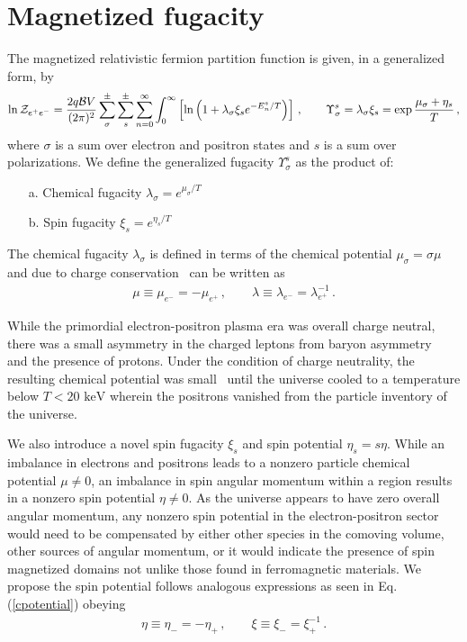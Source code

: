 \documentclass[a4paper]{article}
\newcommand*{\keV}{\text{ keV}}
\newcommand{\req}[1]{Eq.\,(\ref{#1})}
\begin{document}
\section{Magnetized fugacity}
\label{sec:fugacity}
\noindent The magnetized relativistic fermion partition function is given, in a generalized form, by
\begin{align}
    \label{partition}
    \ln{\cal Z}_{e^{+}e^{-}}=\frac{2q{\cal B}V}{(2\pi)^{2}}\sum_{\sigma}^{\pm}\sum_{s}^{\pm}\sum_{n=0}^{\infty}\int_{0}^{\infty}\left[\ln\left(1+\lambda_{\sigma}\xi_{s}e^{-E_{n}^{s}/T}\right)\right]\,,\qquad\Upsilon_{\sigma}^{s}=\lambda_{\sigma}\xi_{s}=\exp{\frac{\mu_{\sigma}+\eta_{s}}{T}}\,,
\end{align}
where $\sigma$ is a sum over electron and positron states and $s$ is a sum over polarizations. We define the generalized fugacity $\Upsilon_{\sigma}^{s}$ as the product of:
\begin{itemize}
    \item[a.] Chemical fugacity $\lambda_{\sigma}=e^{\mu_{\sigma}/T}$
    \item[b.] Spin fugacity $\xi_{s}=e^{\eta_{s}/T}$
\end{itemize}
The chemical fugacity $\lambda_{\sigma}$ is defined in terms of the chemical potential $\mu_{\sigma}=\sigma\mu$ and due to charge conservation~\cite{elze1980relativistic} can be written as 
\begin{align}
    \label{cpotential}
    \mu\equiv\mu_{e^{-}}=-\mu_{e^{+}}\,,\qquad
    \lambda\equiv\lambda_{e^{-}}=\lambda_{e^{+}}^{-1}\,.
\end{align}

While the primordial electron-positron plasma era was overall charge neutral, there was a small asymmetry in the charged leptons from baryon asymmetry~\cite{canetti2012matter} and the presence of protons. Under the condition of charge neutrality, the resulting chemical potential was small~\cite{rafelski2023short} until the universe cooled to a temperature below $T<20\keV$ wherein the positrons vanished from the particle inventory of the universe.

We also introduce a novel spin fugacity $\xi_{s}$ and spin potential $\eta_{s}=s\eta$. While an imbalance in electrons and positrons leads to a nonzero particle chemical potential $\mu\neq0$, an imbalance in spin angular momentum within a region results in a nonzero spin potential $\eta\neq0$. As the universe appears to have zero overall angular momentum, any nonzero spin potential in the electron-positron sector would need to be compensated by either other species in the comoving volume, other sources of angular momentum, or it would indicate the presence of spin magnetized domains not unlike those found in ferromagnetic materials. We propose the spin potential follows analogous expressions as seen in \req{cpotential} obeying
\begin{align}
    \label{spotential}
    \eta\equiv\eta_{-}=-\eta_{+}\,,\qquad
    \xi\equiv\xi_{-}=\xi_{+}^{-1}\,.
\end{align}
\end{document}
